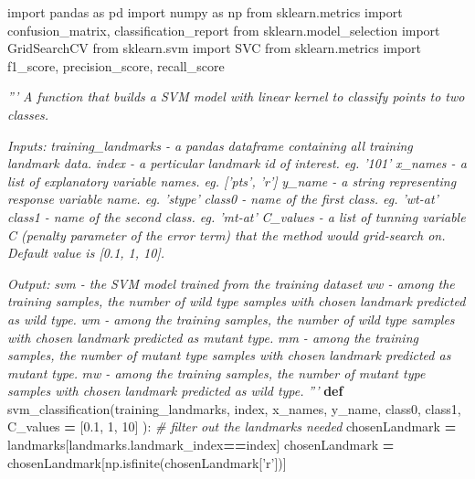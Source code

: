 \documentclass[10pt,letterpaper]{article}
\newenvironment{Shaded}{\begin{snugshade}}{\end{snugshade}}
\newcommand{\KeywordTok}[1]{\textcolor[rgb]{0.13,0.29,0.53}{\textbf{#1}}}
\newcommand{\DecValTok}[1]{\textcolor[rgb]{0.00,0.00,0.81}{#1}}
\newcommand{\FloatTok}[1]{\textcolor[rgb]{0.00,0.00,0.81}{#1}}
\newcommand{\StringTok}[1]{\textcolor[rgb]{0.31,0.60,0.02}{#1}}
\newcommand{\ImportTok}[1]{#1}
\newcommand{\CommentTok}[1]{\textcolor[rgb]{0.56,0.35,0.01}{\textit{#1}}}
\newcommand{\OperatorTok}[1]{\textcolor[rgb]{0.81,0.36,0.00}{\textbf{#1}}}
\newcommand{\NormalTok}[1]{#1}
\begin{document}
\begin{Shaded}
\begin{Highlighting}[]
\ImportTok{import}\NormalTok{ pandas }\ImportTok{as}\NormalTok{ pd}
\ImportTok{import}\NormalTok{ numpy }\ImportTok{as}\NormalTok{ np}
\ImportTok{from}\NormalTok{ sklearn.metrics }\ImportTok{import}\NormalTok{ confusion_matrix, classification_report}
\ImportTok{from}\NormalTok{ sklearn.model_selection }\ImportTok{import}\NormalTok{ GridSearchCV}
\ImportTok{from}\NormalTok{ sklearn.svm }\ImportTok{import}\NormalTok{ SVC}
\ImportTok{from}\NormalTok{ sklearn.metrics }\ImportTok{import}\NormalTok{ f1_score, precision_score, recall_score}

\CommentTok{'''}
\CommentTok{A function that builds a SVM model with linear kernel to classify points to two classes.}

\CommentTok{Inputs:}
\CommentTok{training_landmarks - a pandas dataframe containing all training landmark data.}
\CommentTok{index              - a perticular landmark id of interest. eg. '101'}
\CommentTok{x_names            - a list of explanatory variable names. eg. ['pts', 'r']}
\CommentTok{y_name             - a string representing response variable name. eg. 'stype'}
\CommentTok{class0             - name of the first class. eg. 'wt-at'}
\CommentTok{class1             - name of the second class. eg. 'mt-at'}
\CommentTok{C_values           - a list of tunning variable C (penalty parameter of the error term) that the method would grid-search on. Default value is [0.1, 1, 10].}

\CommentTok{Output:}
\CommentTok{svm                - the SVM model trained from the training dataset}
\CommentTok{ww                 - among the training samples, the number of wild type samples with chosen landmark predicted as wild type.}
\CommentTok{wm                 - among the training samples, the number of wild type samples with chosen landmark predicted as mutant type.}
\CommentTok{mm                 - among the training samples, the number of mutant type samples with chosen landmark predicted as mutant type.}
\CommentTok{mw                 - among the training samples, the number of mutant type samples with chosen landmark predicted as wild type.}
\CommentTok{'''}
\KeywordTok{def}\NormalTok{ svm_classification(training_landmarks, index, x_names, y_name, class0, class1, C_values }\OperatorTok{=}\NormalTok{ [}\FloatTok{0.1}\NormalTok{, }\DecValTok{1}\NormalTok{, }\DecValTok{10}\NormalTok{] ):}
    \CommentTok{# filter out the landmarks needed}
\NormalTok{    chosenLandmark }\OperatorTok{=}\NormalTok{ landmarks[landmarks.landmark_index}\OperatorTok{==}\NormalTok{index]}
\NormalTok{    chosenLandmark }\OperatorTok{=}\NormalTok{ chosenLandmark[np.isfinite(chosenLandmark[}\StringTok{'r'}\NormalTok{])]}
    

\end{Highlighting}
\end{Shaded}
\end{document}
